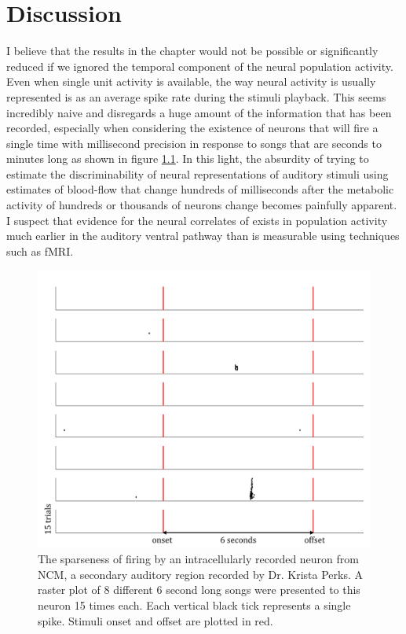 \chapter{Discussion}
I believe that the results in the \CP chapter would not be possible or significantly reduced if we ignored the temporal component of the neural population activity. Even when single unit activity is available, the way neural activity is usually represented is as an average spike rate during the stimuli playback. This seems incredibly naive and disregards a huge amount of the information that has been recorded, especially when considering the existence of neurons that will fire a single time with millisecond precision in response to songs that are seconds to minutes long as shown in figure \ref{fig:sparse}. In this light, the absurdity of trying to estimate the discriminability of neural representations of auditory stimuli using estimates of blood-flow that change hundreds of milliseconds after the metabolic activity of hundreds or thousands of neurons change becomes painfully apparent. I suspect that evidence for the neural correlates of \CP exists in population activity much earlier in the auditory ventral pathway than is measurable using techniques such as fMRI.

\begin{figure}[tbp] 
  \centering
  \includegraphics[width=.9\textwidth]{figures/sparse.png}
  \caption[Sparse firing of NCM neuron.]
{The sparseness of firing by an intracellularly recorded neuron from NCM, a secondary auditory region recorded by Dr. Krista Perks. A raster plot of 8 different 6 second long songs were presented to this neuron 15 times each. Each vertical black tick represents a single spike. Stimuli onset and offset are plotted in red.
}
  \label{fig:sparse}
\end{figure}

